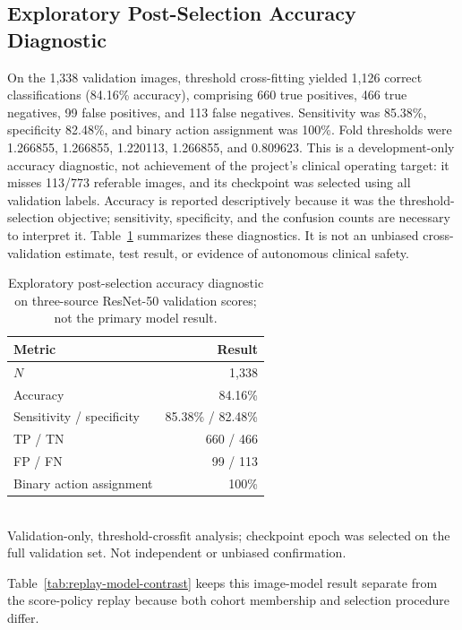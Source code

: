 \documentclass{ieeeaccess}
\begin{document}
\subsection{Exploratory Post-Selection Accuracy Diagnostic}
On the 1,338 validation images, threshold cross-fitting yielded 1,126 correct classifications (84.16\% accuracy), comprising 660 true positives, 466 true negatives, 99 false positives, and 113 false negatives. Sensitivity was 85.38\%, specificity 82.48\%, and binary action assignment was 100\%. Fold thresholds were 1.266855, 1.266855, 1.220113, 1.266855, and 0.809623. This is a development-only accuracy diagnostic, not achievement of the project's clinical operating target: it misses 113/773 referable images, and its checkpoint was selected using all validation labels. Accuracy is reported descriptively because it was the threshold-selection objective; sensitivity, specificity, and the confusion counts are necessary to interpret it. Table~\ref{tab:accuracy-crossfit} summarizes these diagnostics. It is not an unbiased cross-validation estimate, test result, or evidence of autonomous clinical safety.

\begin{table}[t]
\centering
\caption{Exploratory post-selection accuracy diagnostic on three-source ResNet-50 validation scores; not the primary model result.}
\label{tab:accuracy-crossfit}
\small
\begin{tabularx}{\columnwidth}{>{\raggedright\arraybackslash}Xr}
\toprule
Metric & Result \\
\midrule
$N$ & 1,338 \\
Accuracy & 84.16\% \\
Sensitivity / specificity & 85.38\% / 82.48\% \\
TP / TN & 660 / 466 \\
FP / FN & 99 / 113 \\
Binary action assignment & 100\% \\
\bottomrule
\end{tabularx}
\\[2pt]
\footnotesize Validation-only, threshold-crossfit analysis; checkpoint epoch was selected on the full validation set. Not independent or unbiased confirmation.
\end{table}

Table~\ref{tab:replay-model-contrast} keeps this image-model result separate from the score-policy replay because both cohort membership and selection procedure differ.
\end{document}
